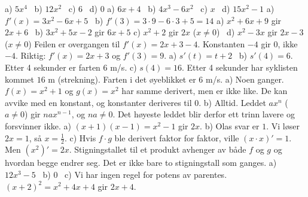 
 a) $5x^4$ \ b) $12x^2$ \ c) $6$ \ d) $0$
 a) $6x + 4$ \ b) $4x^3 - 6x^2$ \ c) $x$ \ d) $15x^2 - 1$
 a) $f'(x) = 3x^2 - 6x + 5$ \ b) $f'(3) = 3\cdot 9 - 6\cdot 3 + 5 = 14$
 a) $x^2 + 6x + 9$ gir $2x + 6$ \ b) $3x^2 + 5x - 2$ gir $6x + 5$
c) $x^2 + 2$ gir $2x$ ($x \neq 0$) \ d) $x^2 - 3x$ gir $2x - 3$ ($x \neq 0$)
 Feilen er overgangen til $f'(x) = 2x + 3 - 4$. Konstanten $-4$ gir $0$, ikke $-4$. Riktig: $f'(x) = 2x + 3$ og $f'(3) = 9$.
 a) $s'(t) = t + 2$ \ b) $s'(4) = 6$. Etter 4 sekunder er farten $6$ m/s.
c) $s(4) = 16$. Etter 4 sekunder har syklisten kommet $16$ m (strekning). Farten i det øyeblikket er $6$ m/s.
 a) Noen ganger. $f(x) = x^2 + 1$ og $g(x) = x^2$ har samme derivert, men er ikke like. De kan avvike med en konstant, og konstanter deriveres til $0$.
b) Alltid. Leddet $ax^n$ ($a \neq 0$) gir $n a x^{n-1}$, og $na \neq 0$. Det høyeste leddet blir derfor ett trinn lavere og forsvinner ikke.
 a) $(x+1)(x-1) = x^2 - 1$ gir $2x$.
b) Olas svar er $1$. Vi løser $2x = 1$, så $x = \frac{1}{2}$.
c) Hvis $f\cdot g$ ble derivert faktor for faktor, ville $(x\cdot x)' = 1$. Men $(x^2)' = 2x$. Stigningstallet til et produkt avhenger av både $f$ og $g$ og hvordan begge endrer seg. Det er ikke bare to stigningstall som ganges.
 a) $12x^3 - 5$ \ b) $0$ \ c) Vi har ingen regel for potens av parentes. $(x+2)^2 = x^2 + 4x + 4$ gir $2x + 4$.

